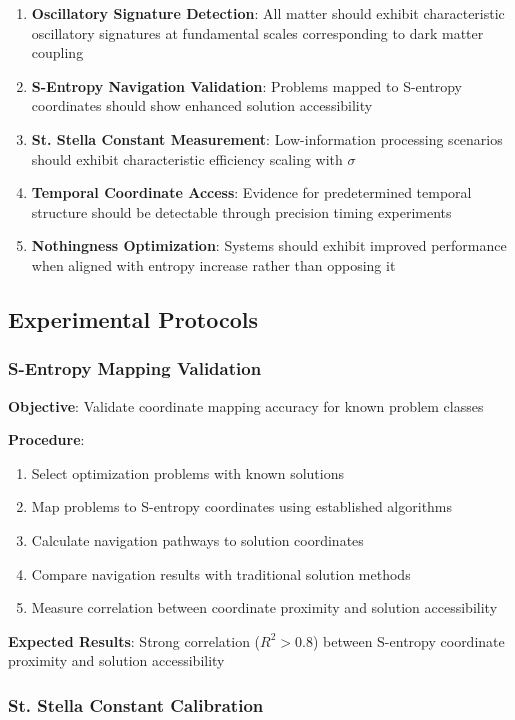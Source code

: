 \documentclass[11pt,a4paper]{article}
\theoremstyle{remark}
\begin{document}
\begin{enumerate}
\item \textbf{Oscillatory Signature Detection}: All matter should exhibit characteristic oscillatory signatures at fundamental scales corresponding to dark matter coupling
\item \textbf{S-Entropy Navigation Validation}: Problems mapped to S-entropy coordinates should show enhanced solution accessibility  
\item \textbf{St. Stella Constant Measurement}: Low-information processing scenarios should exhibit characteristic efficiency scaling with $\sigma$
\item \textbf{Temporal Coordinate Access}: Evidence for predetermined temporal structure should be detectable through precision timing experiments
\item \textbf{Nothingness Optimization}: Systems should exhibit improved performance when aligned with entropy increase rather than opposing it
\end{enumerate}

\subsection{Experimental Protocols}

\subsubsection{S-Entropy Mapping Validation}

\textbf{Objective}: Validate coordinate mapping accuracy for known problem classes

\textbf{Procedure}:
\begin{enumerate}
\item Select optimization problems with known solutions
\item Map problems to S-entropy coordinates using established algorithms
\item Calculate navigation pathways to solution coordinates
\item Compare navigation results with traditional solution methods
\item Measure correlation between coordinate proximity and solution accessibility
\end{enumerate}

\textbf{Expected Results}: Strong correlation ($R^2 > 0.8$) between S-entropy coordinate proximity and solution accessibility

\subsubsection{St. Stella Constant Calibration}
\end{document}
